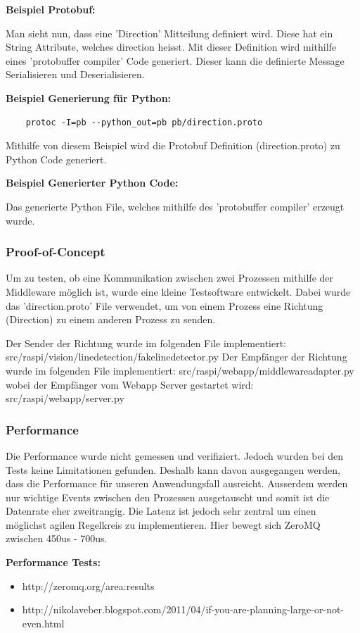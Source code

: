 \documentclass[../../main.tex]{subfiles}
\begin{document}
\textbf{Beispiel Protobuf:}

Man sieht nun, dass eine 'Direction' Mitteilung definiert wird. Diese hat ein String Attribute, welches direction heisst. Mit dieser Definition
wird mithilfe eines 'protobuffer compiler' Code generiert. Dieser kann die definierte Message Serialisieren und Deserialisieren.

\textbf{Beispiel Generierung für Python:}
\begin{lstlisting}
    protoc -I=pb --python_out=pb pb/direction.proto
\end{lstlisting}
Mithilfe von diesem Beispiel wird die Protobuf Definition (direction.proto) zu Python Code generiert.

\textbf{Beispiel Generierter Python Code:}

Das generierte Python File, welches mithilfe des 'protobuffer compiler' erzeugt wurde.

\subsubsection{Proof-of-Concept}
Um zu testen, ob eine Kommunikation zwischen zwei Prozessen mithilfe der Middleware möglich ist, wurde eine kleine Testsoftware entwickelt.
Dabei wurde das 'direction.proto' File verwendet, um von einem Prozess eine Richtung (Direction) zu einem anderen Prozess zu senden.

Der Sender der Richtung wurde im folgenden File implementiert: src/raspi/vision/linedetection/fakelinedetector.py
Der Empfänger der Richtung wurde im folgenden File implementiert: src/raspi/webapp/middlewareadapter.py
wobei der Empfänger vom Webapp Server gestartet wird: src/raspi/webapp/server.py

\subsubsection{Performance}
Die Performance wurde nicht gemessen und verifiziert. Jedoch wurden bei den Tests keine Limitationen gefunden. Deshalb kann davon ausgegangen werden,
dass die Performance für unseren Anwendungsfall ausreicht. Ausserdem werden nur wichtige Events zwischen den Prozessen ausgetauscht und somit ist die Datenrate
eher zweitrangig. Die Latenz ist jedoch sehr zentral um einen möglichst agilen Regelkreis zu implementieren. Hier bewegt sich ZeroMQ zwischen 450us - 700us.

\textbf{Performance Tests:}
\begin{itemize}
    \item http://zeromq.org/area:results
    \item http://nikolaveber.blogspot.com/2011/04/if-you-are-planning-large-or-not-even.html
\end{itemize}
\end{document}
